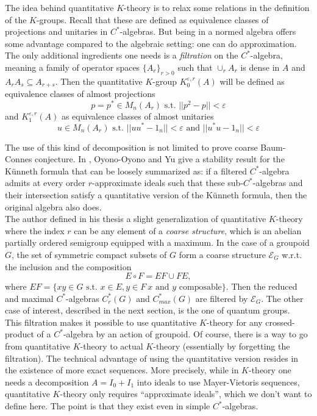 The idea behind quantitative $K$-theory is to relax some relations in the definition of the $K$-groups. Recall that these are defined as equivalence classes of projections and unitaries in $C^*$-algebras. But being in a normed algebra offers some advantage compared to the algebraic setting: one can do approximation. The only additional ingredients one needs is a \textit{filtration} on the $C^*$-algebra, meaning a family of operator spaces $\{A_r\}_{r>0}$ such that $\cup_r A_r$ is dense in $A$ and $A_r A_s \subseteq A_{r+s}$. Then the quantitative $K$-group $K_0^{\varepsilon,r}(A)$ will be defined as equivalence classes of almost projections 
\[p=p^*\in M_n(A_r) \text{ s.t. } ||p^2 - p || <\varepsilon  \] 	 
and $K_1^{\varepsilon,r}(A)$ as equivalence classes of almost unitaries
\[u\in M_n(A_r) \text{ s.t. } ||uu^* - 1_n || <\varepsilon  \text{ and }  ||u^*u - 1_n || <\varepsilon \]

The use of this kind of decomposition is not limited to prove coarse Baum-Connes conjecture. In \cite{OY3}, Oyono-Oyono and Yu give a stability result for the K\"unneth formula that can be loosely summarized as: if a filtered $C^*$-algebra admits at every order $r$-approximate ideals such that these sub-$C^*$-algebras and their intersection satisfy a quantitative version of the K\"unneth formula, then the original algebra also does.\\
  
The author defined in his thesis a slight generalization of quantitative $K$-theory where the index $r$ can be any element of a \textit{coarse structure}, which is an abelian partially ordered semigroup equipped with a maximum. In the case of a groupoid $G$, the set of symmetric compact subsets of $G$ form a coarse structure $\mathcal E_G$ w.r.t. the inclusion and the composition
\[E \circ F = EF \cup FE,\]
where $EF = \{ xy \in G \text{ s.t. } x\in E, y\in F \ x\text{ and } y \text{ composable} \}$. Then the reduced and maximal $C^*$-algebras $C^*_r(G)$ and $C^*_{max}(G)$ are filtered by $\mathcal E_G$. The other case of interest, described in the next section, is the one of quantum groups.\\

This filtration makes it possible to use quantitative $K$-theory for any crossed-product of a $C^*$-algebra by an action of groupoid. Of course, there is a way to go from quantitative $K$-theory to actual $K$-theory (essentially by forgetting the filtration). The technical advantage of using the quantitative version resides in the existence of more exact sequences. More precisely, while in $K$-theory one needs a decomposition $A= I_0+I_1$ into ideals to use Mayer-Vietoris sequences, quantitative $K$-theory only requires ``approximate ideals'', which we don't want to define here. The point is that they exist even in simple $C^*$-algebras. \\

